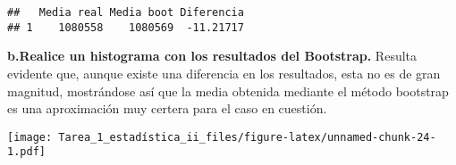 \documentclass[
]{article}
\newenvironment{Shaded}{\begin{snugshade}}{\end{snugshade}}
\newcommand{\AttributeTok}[1]{\textcolor[rgb]{0.13,0.29,0.53}{#1}}
\newcommand{\FunctionTok}[1]{\textcolor[rgb]{0.13,0.29,0.53}{\textbf{#1}}}
\newcommand{\NormalTok}[1]{#1}
\newcommand{\OtherTok}[1]{\textcolor[rgb]{0.56,0.35,0.01}{#1}}
\newcommand{\SpecialCharTok}[1]{\textcolor[rgb]{0.81,0.36,0.00}{\textbf{#1}}}
\newcommand{\StringTok}[1]{\textcolor[rgb]{0.31,0.60,0.02}{#1}}
\begin{document}
\begin{Shaded}
\end{Shaded}

\begin{verbatim}
##   Media real Media boot Diferencia
## 1    1080558    1080569  -11.21717
\end{verbatim}

\textbf{b.Realice un histograma con los resultados del Bootstrap.}
Resulta evidente que, aunque existe una diferencia en los resultados,
esta no es de gran magnitud, mostrándose así que la media obtenida
mediante el método bootstrap es una aproximación muy certera para el
caso en cuestión.

\begin{Shaded}
\end{Shaded}

\texttt{[image: Tarea\_1\_estadística\_ii\_files/figure-latex/unnamed-chunk-24-1.pdf]}
\end{document}
